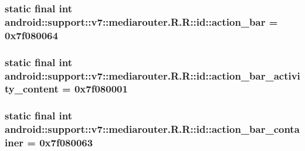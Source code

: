 \hypertarget{classandroid_1_1support_1_1v7_1_1mediarouter_1_1_r_1_1id_54699298c2c08d603fb1a4208ddfbf83}{
\subsubsection[{action\_\-bar}]{\setlength{\rightskip}{0pt plus 5cm}static final int android::support::v7::mediarouter.R.R::id::action\_\-bar = 0x7f080064}}
\label{classandroid_1_1support_1_1v7_1_1mediarouter_1_1_r_1_1id_54699298c2c08d603fb1a4208ddfbf83}


\hypertarget{classandroid_1_1support_1_1v7_1_1mediarouter_1_1_r_1_1id_cb25fe46760976c9a111b970e8a37ea2}{
\subsubsection[{action\_\-bar\_\-activity\_\-content}]{\setlength{\rightskip}{0pt plus 5cm}static final int android::support::v7::mediarouter.R.R::id::action\_\-bar\_\-activity\_\-content = 0x7f080001}}
\label{classandroid_1_1support_1_1v7_1_1mediarouter_1_1_r_1_1id_cb25fe46760976c9a111b970e8a37ea2}


\hypertarget{classandroid_1_1support_1_1v7_1_1mediarouter_1_1_r_1_1id_996435f5a2341927f0db57d570ae7554}{
\subsubsection[{action\_\-bar\_\-container}]{\setlength{\rightskip}{0pt plus 5cm}static final int android::support::v7::mediarouter.R.R::id::action\_\-bar\_\-container = 0x7f080063}}
\label{classandroid_1_1support_1_1v7_1_1mediarouter_1_1_r_1_1id_996435f5a2341927f0db57d570ae7554}


